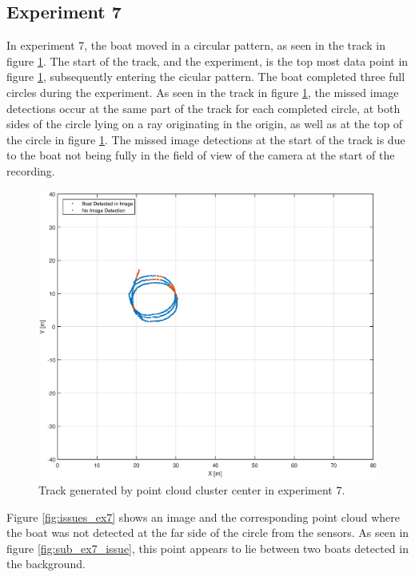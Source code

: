 \subsection{Experiment 7}
In experiment 7, the boat moved in a circular pattern, as seen in the track in figure \ref{fig:ex7_track}. The start of the track, and the experiment, is the top most data point in figure \ref{fig:ex7_track}, subsequently entering the cicular pattern. The boat completed three full circles during the experiment. As seen in the track in figure \ref{fig:ex7_track}, the missed image detections occur at the same part of the track for each completed circle, at both sides of the circle lying on a ray originating in the origin, as well as at the top of the circle in figure \ref{fig:ex7_track}. The missed image detections at the start of the track is due to the boat not being fully in the field of view of the camera at the start of the recording.
\begin{figure}[H]
	\centering
	\includegraphics[width=.8\linewidth]{fig/exp_7_track.eps}
	\caption{Track generated by point cloud cluster center in experiment 7.}
	\label{fig:ex7_track}
\end{figure}
Figure \ref{fig:issues_ex7} shows an image and the corresponding point cloud where the boat was not detected at the far side of the circle from the sensors. As seen in figure \ref{fig:sub_ex7_issue}, this point appears to lie between two boats detected in the background.
